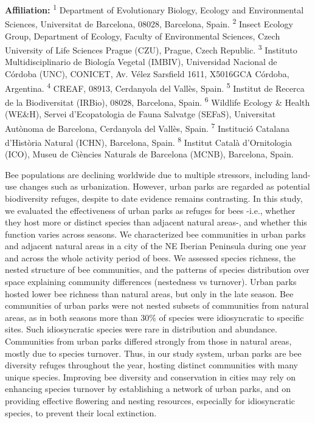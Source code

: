 \documentclass[
  letterpaper,
  DIV=11,
  numbers=noendperiod]{scrartcl}
\begin{document}
\textbf{Affiliation:} \textsuperscript{1} Department of Evolutionary
Biology, Ecology and Environmental Sciences, Universitat de Barcelona,
08028, Barcelona, Spain. \textsuperscript{2} Insect Ecology Group,
Department of Ecology, Faculty of Environmental Sciences, Czech
University of Life Sciences Prague (CZU), Prague, Czech Republic.
\textsuperscript{3} Instituto Multidisciplinario de Biología Vegetal
(IMBIV), Universidad Nacional de Córdoba (UNC), CONICET, Av. Vélez
Sarsfield 1611, X5016GCA Córdoba, Argentina. \textsuperscript{4} CREAF,
08913, Cerdanyola del Vallès, Spain. \textsuperscript{5} Institut de
Recerca de la Biodiversitat (IRBio), 08028, Barcelona, Spain.
\textsuperscript{6} Wildlife Ecology \& Health (WE\&H), Servei
d'Ecopatologia de Fauna Salvatge (SEFaS), Universitat Autònoma de
Barcelona, Cerdanyola del Vallès, Spain. \textsuperscript{7} Institució
Catalana d'Història Natural (ICHN), Barcelona, Spain.
\textsuperscript{8} Institut Català d'Ornitologia (ICO), Museu de
Ciències Naturals de Barcelona (MCNB), Barcelona, Spain.

Bee populations are declining worldwide due to multiple stressors,
including land-use changes such as urbanization. However, urban parks
are regarded as potential biodiversity refuges, despite to date evidence
remains contrasting. In this study, we evaluated the effectiveness of
urban parks as refuges for bees -i.e., whether they host more or
distinct species than adjacent natural areas-, and whether this function
varies across seasons. We characterized bee communities in urban parks
and adjacent natural areas in a city of the NE Iberian Peninsula during
one year and across the whole activity period of bees. We assessed
species richness, the nested structure of bee communities, and the
patterns of species distribution over space explaining community
differences (nestedness vs turnover). Urban parks hosted lower bee
richness than natural areas, but only in the late season. Bee
communities of urban parks were not nested subsets of communities from
natural areas, as in both seasons more than 30\% of species were
idiosyncratic to specific sites. Such idiosyncratic species were rare in
distribution and abundance. Communities from urban parks differed
strongly from those in natural areas, mostly due to species turnover.
Thus, in our study system, urban parks are bee diversity refuges
throughout the year, hosting distinct communities with many unique
species. Improving bee diversity and conservation in cities may rely on
enhancing species turnover by establishing a network of urban parks, and
on providing effective flowering and nesting resources, especially for
idiosyncratic species, to prevent their local extinction.
\end{document}
